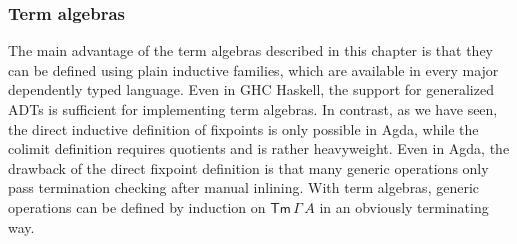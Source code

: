 \documentclass[12pt,a4paper,twoside,openany]{book}
\theoremstyle{remark}
\theoremstyle{definition}
\theoremstyle{theorem}
\newcommand{\Tm}{\mathsf{Tm}}
\begin{document}
\subsubsection{Term algebras}
The main advantage of the term algebras described in this chapter is that they
can be defined using plain inductive families, which are available in every
major dependently typed language. Even in GHC Haskell, the support for
generalized ADTs \cite{gadts} is sufficient for implementing term algebras. In
contrast, as we have seen, the direct inductive definition of fixpoints is only
possible in Agda, while the colimit definition requires quotients and is rather
heavyweight. Even in Agda, the drawback of the direct fixpoint definition is
that many generic operations only pass termination checking after manual
inlining. With term algebras, generic operations can be defined by induction on
$\Tm\,\Gamma\,A$ in an obviously terminating way.
\end{document}
